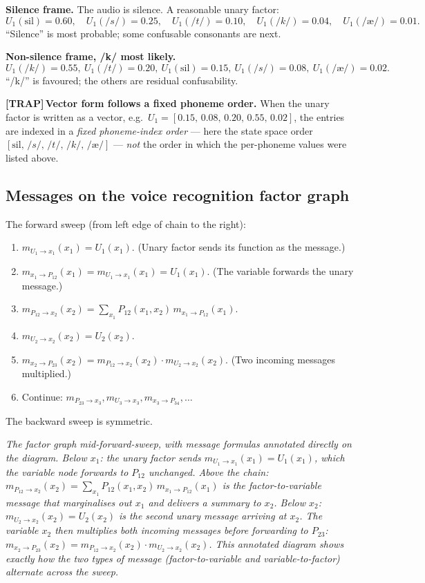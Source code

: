 \documentclass[11pt, a4paper]{article}
\newcommand{\trapflag}{\textcolor{trapBd}{\textbf{[TRAP]}}\,}
\begin{document}
\textbf{Silence frame.} The audio is silence. A reasonable unary factor:
\[
U_1(\text{sil}) = 0.60,\quad U_1(/s/) = 0.25,\quad U_1(/t/) = 0.10,\quad U_1(/k/) = 0.04,\quad U_1(/\text{æ}/) = 0.01.
\]
``Silence'' is most probable; some confusable consonants are next.

\textbf{Non-silence frame, /k/ most likely.}
\[
U_1(/k/) = 0.55,\ U_1(/t/) = 0.20,\ U_1(\text{sil}) = 0.15,\ U_1(/s/) = 0.08,\ U_1(/\text{æ}/) = 0.02.
\]
``/k/'' is favoured; the others are residual confusability.

\trapflag{}\textbf{Vector form follows a fixed phoneme order.} When the unary factor is written as a vector, e.g.\ $U_1 = [0.15,\, 0.08,\, 0.20,\, 0.55,\, 0.02]$, the entries are indexed in a \emph{fixed phoneme-index order} — here the state space order $[\text{sil},\, /s/,\, /t/,\, /k/,\, /\text{æ}/]$ — \emph{not} the order in which the per-phoneme values were listed above.

\subsection{Messages on the voice recognition factor graph}

The forward sweep (from left edge of chain to the right):

\begin{enumerate}
  \item $m_{U_1\to x_1}(x_1) = U_1(x_1)$. (Unary factor sends its function as the message.)
  \item $m_{x_1\to P_{12}}(x_1) = m_{U_1\to x_1}(x_1) = U_1(x_1)$. (The variable forwards the unary message.)
  \item $m_{P_{12}\to x_2}(x_2) = \sum_{x_1} P_{12}(x_1, x_2)\,m_{x_1\to P_{12}}(x_1)$.
  \item $m_{U_2\to x_2}(x_2) = U_2(x_2)$.
  \item $m_{x_2\to P_{23}}(x_2) = m_{P_{12}\to x_2}(x_2) \cdot m_{U_2\to x_2}(x_2)$. (Two incoming messages multiplied.)
  \item Continue: $m_{P_{23}\to x_3}, m_{U_3\to x_3}, m_{x_3\to P_{34}}, \ldots$
\end{enumerate}

The backward sweep is symmetric.

\begin{center}

\footnotesize\textit{The factor graph mid-forward-sweep, with message formulas annotated directly on the diagram. Below $x_1$: the unary factor sends $m_{U_1\to x_1}(x_1) = U_1(x_1)$, which the variable node forwards to $P_{12}$ unchanged. Above the chain: $m_{P_{12}\to x_2}(x_2) = \sum_{x_1} P_{12}(x_1, x_2)\,m_{x_1\to P_{12}}(x_1)$ is the factor-to-variable message that marginalises out $x_1$ and delivers a summary to $x_2$. Below $x_2$: $m_{U_2\to x_2}(x_2) = U_2(x_2)$ is the second unary message arriving at $x_2$. The variable $x_2$ then multiplies both incoming messages before forwarding to $P_{23}$: $m_{x_2\to P_{23}}(x_2) = m_{P_{12}\to x_2}(x_2)\cdot m_{U_2\to x_2}(x_2)$. This annotated diagram shows exactly how the two types of message (factor-to-variable and variable-to-factor) alternate across the sweep.}
\end{center}
\end{document}

